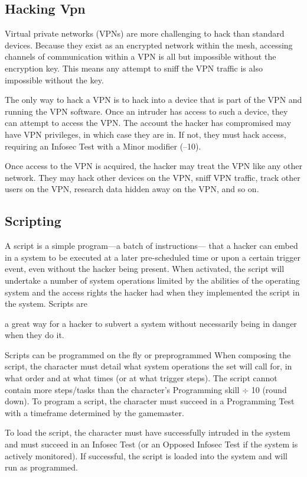 \subsection{Hacking Vpn} 

Virtual private networks (VPNs) are more challenging to hack than standard devices. Because they exist as an encrypted network within the mesh, accessing channels of communication within a VPN is all but impossible without the encryption key. This means any attempt to sniff the VPN traffic is also impossible without the key. 

The only way to hack a VPN is to hack into a device that is part of the VPN and running the VPN software. Once an intruder has access to such a device, they can attempt to access the VPN. The account the hacker has compromised may have VPN privileges, in which case they are in. If not, they must hack access, requiring an Infosec Test with a Minor modifier (–10). 

Once access to the VPN is acquired, the hacker may treat the VPN like any other network. They may hack other devices on the VPN, sniff VPN traffic, track other users on the VPN, research data hidden away on the VPN, and so on. 

\subsection{Scripting} 

A script is a simple program—a batch of instructions— that a hacker can embed in a system to be executed at a later pre-scheduled time or upon a certain trigger event, even without the hacker being present. When activated, the script will undertake a number of system operations limited by the abilities of the operating system and the access rights the hacker had when they implemented the script in the system. Scripts are 

a great way for a hacker to subvert a system without necessarily being in danger when they do it. 

Scripts can be programmed on the fly or preprogrammed When composing the script, the character must detail what system operations the set will call for, in what order and at what times (or at what trigger steps). The script cannot contain more steps/tasks than the character's Programming skill $\div$ 10 (round down). To program a script, the character must succeed in a Programming Test with a timeframe determined by the gamemaster. 

To load the script, the character must have successfully intruded in the system and must succeed in an Infosec Test (or an Opposed Infosec Test if the system is actively monitored). If successful, the script is loaded into the system and will run as programmed. 

